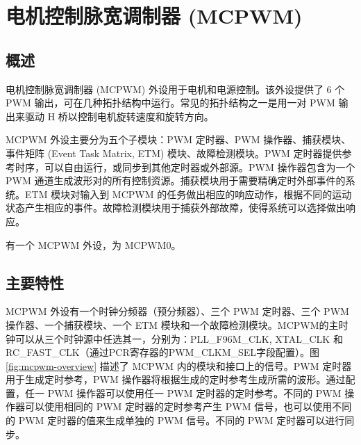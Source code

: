 \documentclass[main\_\_CN.tex]{subfiles}
\begin{document}

\ifglobal
\else
    {\let\clearpage\relax \listoftodos}
    \tableofcontents
\fi



\hypertarget{mcpwm}{}
\chapter{电机控制脉宽调制器 (MCPWM)}
\label{mod:mcpwm}


\section{概述}
电机控制脉宽调制器 (MCPWM) 外设用于电机和电源控制。该外设提供了 6 个 PWM 输出，可在几种拓扑结构中运行。常见的拓扑结构之一是用一对 PWM 输出来驱动 H 桥以控制电机旋转速度和旋转方向。

MCPWM 外设主要分为五个子模块：PWM 定时器、PWM 操作器、捕获模块、事件矩阵 (Event Task Matrix, ETM) 模块、故障检测模块。PWM 定时器提供参考时序，可以自由运行，或同步到其他定时器或外部源。PWM 操作器包含为一个 PWM 通道生成波形对的所有控制资源。捕获模块用于需要精确定时外部事件的系统。ETM 模块对输入到 MCPWM 的任务做出相应的响应动作，根据不同的运动状态产生相应的事件。故障检测模块用于捕获外部故障，使得系统可以选择做出响应。

\chipname{} 有一个 MCPWM 外设，为 MCPWM0。

\section{主要特性}

MCPWM 外设有一个时钟分频器（预分频器）、三个 PWM 定时器、三个 PWM 操作器、一个捕获模块、一个 ETM 模块和一个故障检测模块。MCPWM的主时钟可以从三个时钟源中任选其一，分别为：PLL\_F96M\_CLK, XTAL\_CLK 和 RC\_FAST\_CLK（通过PCR寄存器的PWM\_CLKM\_SEL字段配置）。图 \ref{fig:mcpwm-overview} 描述了 MCPWM 内的模块和接口上的信号。PWM 定时器用于生成定时参考，PWM 操作器将根据生成的定时参考生成所需的波形。通过配置，任一 PWM 操作器可以使用任一 PWM 定时器的定时参考。不同的 PWM 操作器可以使用相同的 PWM 定时器的定时参考产生 PWM 信号，也可以使用不同的 PWM 定时器的值来生成单独的 PWM 信号。不同的 PWM 定时器可以进行同步。
\end{document}

